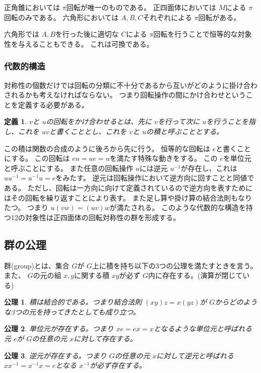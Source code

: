 \documentclass[dvipdfmx]{jsarticle}
\newtheorem{defi}{定義}
\newtheorem{axio}{公理}
\begin{document}
正角錐においては $\pi$回転が唯一のものである。
正四面体においては $M$による $\pi$回転のみである。
六角形においては $A,B,C$それぞれによる $\pi$回転がある。

六角形では $A,B$を行った後に適切な $C$による $\pi$回転を行うことで恒等的な対象性を与えることもできる。
これは可換である。

\subsubsection{代数的構造}
対称性の個数だけでは回転の分類に不十分であるから互いがどのように掛け合わされるかも考えなければならない。
つまり回転操作の間にかけ合わせということを定義する必要がある。

\begin{defi}
$v$と $u$の回転をかけ合わせるとは、先に $v$を行って次に $u$を行うことを指し、これを $uv$と書くこととし、これを $v$と $u$の積と呼ぶこととする。
\end{defi}

この積は関数の合成のように後ろから先に行う。
恒等的な回転は $e$と書くことにする。
この回転は $eu = ue = u$を満たす特殊な動きをする。
この $e$を単位元と呼ぶことにする。
また任意の回転操作 $u$には逆元 $u^{-1}$が存在し、これは
$uu^{-1} = u^{-1}u = e$をみたす。
逆元は回転操作において逆方向に回すことと同値である。
ただし、回転は一方向に向けて定義されているので逆方向を表すためにはその回転を繰り返すことにより表す。
また足し算や掛け算の結合法則もなりたつ。
つまり $u(vw) = (uv)w$が満たされる。
このような代数的な構造を持つ12の対象性は正四面体の回転対称性の群を形成する。

\subsection{群の公理}

群(group)とは、集合 $G$が $G$上に積を持ち以下の3つの公理を満たすときを言う。
また、 $G$の元の組 $x,y$に関する積 $xy$が必ず $G$内に存在する。(演算が閉じている)

\begin{axio}
  積は結合的である。つまり結合法則 $(xy)z = x(yz)$が $G$からどのような3つの元を持ってきたとしても成り立つ。
\end{axio}

\begin{axio}
  単位元が存在する。つまり $xe = ex =x$となるような単位元と呼ばれる元 $e$が $G$の任意の元 $x$に対して存在する。
\end{axio}

\begin{axio}
  逆元が存在する。つまり $G$の任意の元 $x$に対して逆元と呼ばれる $xx^{-1} = x^{-1}x = e$となる $x^{-1}$が必ず存在する。
\end{axio}
\end{document}
